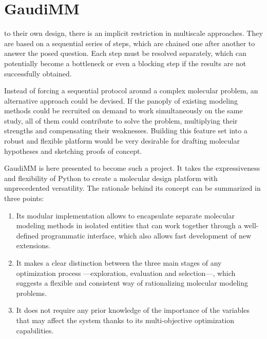 
\chapter{GaudiMM}
\label{chap:04}


 to their own design, there is an implicit restriction in multiscale approaches. They are based on a sequential series of steps, which are chained one after another to answer the posed question. Each step must be resolved separately, which can potentially become a bottleneck or even a blocking step if the results are not successfully obtained.


Instead of forcing a sequential protocol around a complex molecular problem, an alternative approach could be devised. If the panoply of existing modeling methods could be recruited on demand to work simultaneously on the same study, all of them could contribute to solve the problem, multiplying their strengths and compensating their weaknesses. Building this feature set into a robust and flexible platform would be very desirable for drafting molecular hypotheses and sketching proofs of concept.

GaudiMM is here presented to become such a project. It takes the expressiveness and flexibility of Python to create a molecular design platform with unprecedented versatility. The rationale behind its concept can be summarized in three points:

\begin{enumerate}
	\item Its modular implementation allows to encapsulate separate molecular modeling methods in isolated entities that can work together through a well-defined programmatic interface, which also allows fast development of new extensions.

	\item It makes a clear distinction between the three main stages of any optimization process ---exploration, evaluation and selection---, which suggests a flexible and consistent way of rationalizing molecular modeling problems.

	\item It does not require any prior knowledge of the importance of the variables that may affect the system thanks to its multi-objective optimization capabilities.
\end{enumerate}

